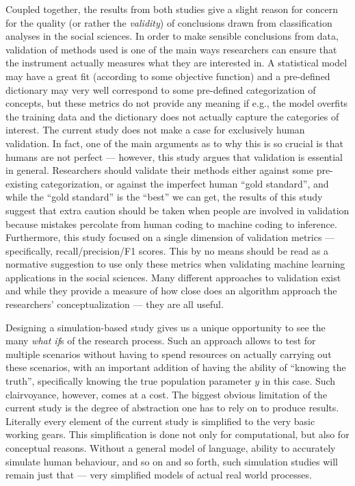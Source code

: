 \documentclass[man, 12pt, a4paper, nolmodern, noextraspace]{apa6}
\begin{document}
Coupled together, the results from both studies give a slight reason for concern for the quality (or rather the \textit{validity}) of conclusions drawn from classification analyses in the social sciences. In order to make sensible conclusions from data, validation of methods used is one of the main ways researchers can ensure that the instrument actually measures what they are interested in. A statistical model may have a great fit (according to some objective function) and a pre-defined dictionary may very well correspond to some pre-defined categorization of concepts, but these metrics do not provide any meaning if e.g., the model overfits the training data and the dictionary does not actually capture the categories of interest. The current study does not make a case for exclusively human validation. In fact, one of the main arguments as to why this is so crucial is that humans are not perfect --- however, this study argues that validation is essential in general. Researchers should validate their methods either against some pre-existing categorization, or against the imperfect human ``gold standard'', and while the ``gold standard'' is the ``best'' we can get, the results of this study suggest that extra caution should be taken when people are involved in validation because mistakes percolate from human coding to machine coding to inference. Furthermore, this study focused on a single dimension of validation metrics --- specifically, recall/precision/F1 scores. This by no means should be read as a normative suggestion to use only these metrics when validating machine learning applications in the social sciences. Many different approaches to validation exist and while they provide a measure of how close does an algorithm approach the researchers' conceptualization --- they are all useful.


Designing a simulation-based study gives us a unique opportunity to see the many \textit{what if}s of the research process. Such an approach allows to test for multiple scenarios without having to spend resources on actually carrying out these scenarios, with an important addition of having the ability of ``knowing the truth'', specifically knowing the true population parameter $y$ in this case. Such clairvoyance, however, comes at a cost. The biggest obvious limitation of the current study is the degree of abstraction one has to rely on to produce results. Literally every element of the current study is simplified to the very basic working gears. This simplification is done not only for computational, but also for conceptual reasons. Without a general model of language, ability to accurately simulate human behaviour, and so on and so forth, such simulation studies will remain just that --- very simplified models of actual real world processes. 
\end{document}
